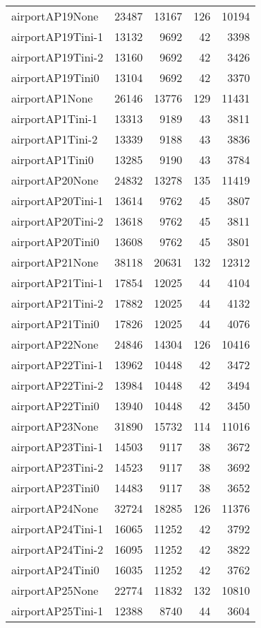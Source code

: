 \begin{longtable}{lrrrr}
airportAP19None & 23487 & 13167 & 126 & 10194 \\
airportAP19Tini-1 & 13132 & 9692 & 42 & 3398 \\
airportAP19Tini-2 & 13160 & 9692 & 42 & 3426 \\
airportAP19Tini0 & 13104 & 9692 & 42 & 3370 \\
airportAP1None & 26146 & 13776 & 129 & 11431 \\
airportAP1Tini-1 & 13313 & 9189 & 43 & 3811 \\
airportAP1Tini-2 & 13339 & 9188 & 43 & 3836 \\
airportAP1Tini0 & 13285 & 9190 & 43 & 3784 \\
airportAP20None & 24832 & 13278 & 135 & 11419 \\
airportAP20Tini-1 & 13614 & 9762 & 45 & 3807 \\
airportAP20Tini-2 & 13618 & 9762 & 45 & 3811 \\
airportAP20Tini0 & 13608 & 9762 & 45 & 3801 \\
airportAP21None & 38118 & 20631 & 132 & 12312 \\
airportAP21Tini-1 & 17854 & 12025 & 44 & 4104 \\
airportAP21Tini-2 & 17882 & 12025 & 44 & 4132 \\
airportAP21Tini0 & 17826 & 12025 & 44 & 4076 \\
airportAP22None & 24846 & 14304 & 126 & 10416 \\
airportAP22Tini-1 & 13962 & 10448 & 42 & 3472 \\
airportAP22Tini-2 & 13984 & 10448 & 42 & 3494 \\
airportAP22Tini0 & 13940 & 10448 & 42 & 3450 \\
airportAP23None & 31890 & 15732 & 114 & 11016 \\
airportAP23Tini-1 & 14503 & 9117 & 38 & 3672 \\
airportAP23Tini-2 & 14523 & 9117 & 38 & 3692 \\
airportAP23Tini0 & 14483 & 9117 & 38 & 3652 \\
airportAP24None & 32724 & 18285 & 126 & 11376 \\
airportAP24Tini-1 & 16065 & 11252 & 42 & 3792 \\
airportAP24Tini-2 & 16095 & 11252 & 42 & 3822 \\
airportAP24Tini0 & 16035 & 11252 & 42 & 3762 \\
airportAP25None & 22774 & 11832 & 132 & 10810 \\
airportAP25Tini-1 & 12388 & 8740 & 44 & 3604 \\

\end{longtable}
